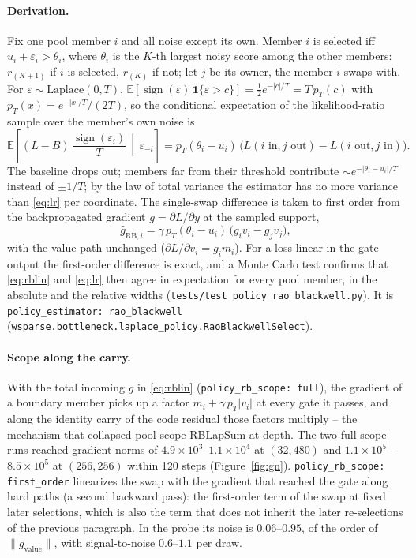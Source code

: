 \documentclass[11pt,a4paper]{article}
\newcommand{\code}[1]{\texttt{#1}}
\newcommand{\sgn}{\operatorname{sign}}
\begin{document}
\paragraph{Derivation.}
Fix one pool member $i$ and all noise except its own. Member $i$ is selected iff
$u_i + \varepsilon_i > \theta_i$, where $\theta_i$ is the $K$-th largest noisy
score among the other members: $r_{(K+1)}$ if $i$ is selected, $r_{(K)}$ if not;
let $j$ be its owner, the member $i$ swaps with. For $\varepsilon \sim
\mathrm{Laplace}(0, T)$, $\mathbb E[\sgn(\varepsilon)\,\mathbf 1\{\varepsilon >
c\}] = \tfrac12 e^{-|c|/T} = T\,p_T(c)$ with $p_T(x) = e^{-|x|/T} / (2T)$, so
the conditional expectation of the likelihood-ratio sample over the member's
own noise is
\begin{equation}
\mathbb E\!\left[(L - B)\,\frac{\sgn(\varepsilon_i)}{T} \,\middle|\, \varepsilon_{-i}\right]
= p_T(\theta_i - u_i)\,\big(L(i \text{ in}, j \text{ out}) - L(i \text{ out}, j \text{ in})\big).
\label{eq:rb}
\end{equation}
The baseline drops out; members far from their threshold contribute
$\sim e^{-|\theta_i - u_i|/T}$ instead of $\pm 1/T$; by the law of total variance
the estimator has no more variance than \eqref{eq:lr} per coordinate. The
single-swap difference is taken to first order from the backpropagated gradient
$g = \partial L / \partial y$ at the sampled support,
\begin{equation}
\hat g_{\mathrm{RB}, i} = \gamma\, p_T(\theta_i - u_i)\,\big(g_i v_i - g_j v_j\big),
\label{eq:rblin}
\end{equation}
with the value path unchanged ($\partial L / \partial v_i = g_i m_i$). For a
loss linear in the gate output the first-order difference is exact, and a Monte
Carlo test confirms that \eqref{eq:rblin} and \eqref{eq:lr} then agree in
expectation for every pool member, in the absolute and the relative widths
(\code{tests/test\_policy\_rao\_blackwell.py}). It is
\code{policy\_estimator: rao\_blackwell}
(\code{wsparse.bottleneck.laplace\_policy.RaoBlackwellSelect}).

\paragraph{Scope along the carry.}
With the total incoming $g$ in \eqref{eq:rblin} (\code{policy\_rb\_scope: full}),
the gradient of a boundary member picks up a factor $m_i + \gamma\, p_T |v_i|$ at
every gate it passes, and along the identity carry of the code residual those
factors multiply -- the mechanism that collapsed pool-scope RBLapSum at depth.
The two full-scope runs reached gradient norms of $4.9 \times 10^3$--$1.1 \times
10^4$ at $(32, 480)$ and $1.1 \times 10^5$--$8.5 \times 10^5$ at $(256, 256)$
within 120 steps (Figure~\ref{fig:gn}). \code{policy\_rb\_scope: first\_order}
linearizes the swap with the gradient that reached the gate along hard paths (a
second backward pass): the first-order term of the swap at fixed later
selections, which is also the term that does not inherit the later re-selections
of the previous paragraph. In the probe its noise is $0.06$--$0.95$, of the
order of $\|g_{\mathrm{value}}\|$, with signal-to-noise $0.6$--$1.1$ per draw.
\end{document}
